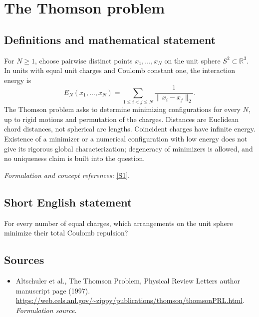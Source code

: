 \documentclass[11pt]{article}
\begin{document}
\section*{\texorpdfstring{The Thomson problem}{The Thomson problem}}\label{7200088}
\subsection{Definitions and mathematical statement}
For $N\ge1$, choose pairwise distinct points $x_1,\ldots,x_N$ on the unit sphere $S^2\subset{\mathbb{R}}^3$. In units with equal unit charges and Coulomb constant one, the interaction energy is
\[
 E_N(x_1,\ldots,x_N)=\sum_{1\le i<j\le N}\frac1{\|x_i-x_j\|_2}.
\]
The Thomson problem asks to determine minimizing configurations for every $N$, up to rigid motions and permutation of the charges. Distances are Euclidean chord distances, not spherical arc lengths. Coincident charges have infinite energy. Existence of a minimizer or a numerical configuration with low energy does not give its rigorous global characterization; degeneracy of minimizers is allowed, and no uniqueness claim is built into the question.
\par\smallskip\textit{Formulation and concept references:} \href{https://web.cels.anl.gov/~zippy/publications/thomson/thomsonPRL.html}{[S1]}.

\subsection{Short English statement}
For every number of equal charges, which arrangements on the unit sphere minimize their total Coulomb repulsion?
\subsection{Sources}
\begin{itemize}
\item[S1]Altschuler et al., The Thomson Problem, Physical Review Letters author manuscript page (1997).
\url{https://web.cels.anl.gov/~zippy/publications/thomson/thomsonPRL.html}.
\textit{Formulation source.}
\end{itemize}
\end{document}
